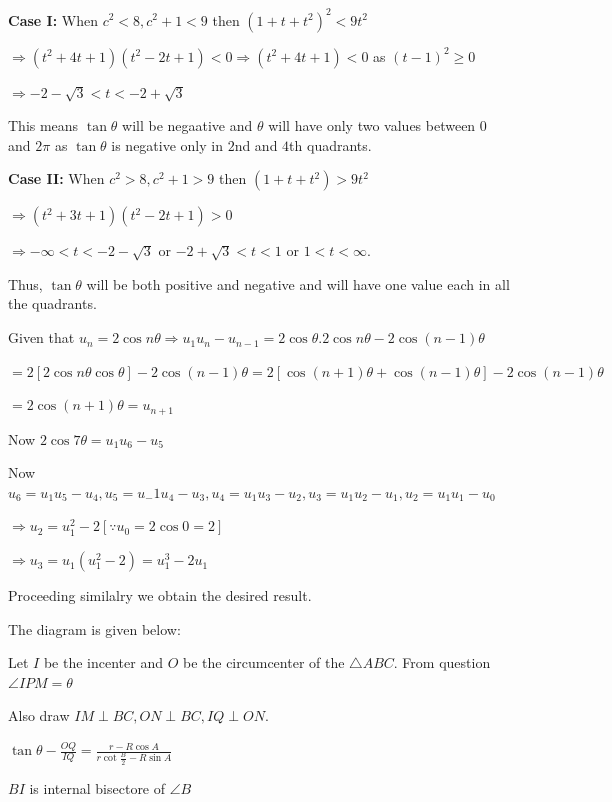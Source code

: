   {\bf Case I:} When $c^2 < 8, c^2 + 1 < 9$ then $\left(1 + t + t^2\right)^2 < 9t^2$

  $\Rightarrow (t^2 + 4t + 1)(t^2 - 2t + 1) < 0 \Rightarrow (t^2 + 4t + 1) < 0$ as $(t - 1)^2 \ge 0$

  $\Rightarrow -2 - \sqrt{3} < t < -2 + \sqrt{3}$

  This means $\tan\theta$ will be negaative and $\theta$ will have only two values between $0$ and $2\pi$
  as $\tan\theta$ is negative only in $2$nd and $4$th quadrants.

  {\bf Case II:} When $c^2 > 8, c^2 + 1 > 9$ then $\left(1 + t + t^2\right) > 9t^2$

  $\Rightarrow (t^2 + 3t + 1)(t^2 - 2t + 1) > 0$

  $\Rightarrow -\infty < t < -2 -\sqrt{3}$ or $-2 + \sqrt{3} < t < 1$ or $1 < t < \infty$.

  Thus, $\tan\theta$ will be both positive and negative and will have one value each in all the quadrants.
\item Given that $u_n = 2\cos n\theta \Rightarrow u_1u_n - u_{n - 1} = 2\cos\theta.2\cos n\theta - 2\cos(n -
  1)\theta$

  $= 2[2\cos n\theta\cos\theta] - 2\cos(n - 1)\theta = 2[\cos(n + 1)\theta + \cos(n - 1)\theta] - 2\cos(n -
  1)\theta$

  $= 2\cos(n + 1)\theta = u_{n + 1}$

  Now $2\cos7\theta = u_1u_6 - u_5$

  Now $u_6 = u_1u_5 - u_4, u_5 = u_-1u_4 - u_3, u_4 = u_1u_3 - u_2, u_3 = u_1u_2 - u_1, u_2 = u_1u_1 - u_0$

  $\Rightarrow u_2 = u_1^2 - 2[\because u_0 = 2\cos0 = 2]$

  $\Rightarrow u_3 = u_1\left(u_1^2 - 2\right) = u_1^3 - 2u_1$

  Proceeding similalry we obtain the desired result.
\item The diagram is given below:

  \startplacefigure
    \externalfigure[17_2.pdf]
  \stopplacefigure

  Let $I$ be the incenter and $O$ be the circumcenter of the $\triangle ABC$. From question $\angle IPM
  = \theta$

  Also draw $IM\perp BC, ON\perp BC, IQ\perp ON$.

  $\tan\theta - \frac{OQ}{IQ} = \frac{r - R\cos A}{r\cot\frac{B}{2} - R\sin A}$

  $BI$ is internal bisectore of $\angle B$

